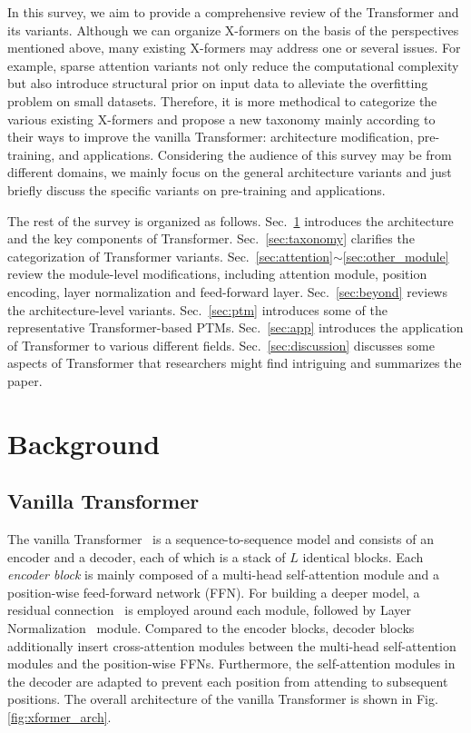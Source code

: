 \documentclass[manuscript,acmsmall,screen,nonacm]{acmart}
\theoremstyle{definition}
\begin{document}
In this survey, we aim to provide a comprehensive review of the Transformer and its variants. Although we can organize X-formers on the basis of the perspectives mentioned above, many existing X-formers may address one or several issues. For example, sparse attention variants not only reduce the computational complexity but also introduce structural prior on input data to alleviate the overfitting problem on small datasets. Therefore, it is more methodical to categorize the various existing X-formers and propose a new taxonomy mainly according to their ways to improve the vanilla Transformer: architecture modification, pre-training, and applications.
Considering the audience of this survey may be from different domains, we mainly focus on the general architecture variants and just briefly discuss the specific variants on pre-training and applications.

The rest of the survey is organized as follows. Sec.~\ref{sec:background} introduces the architecture and the key components of Transformer. Sec.~\ref{sec:taxonomy} clarifies the categorization of Transformer variants. Sec.~\ref{sec:attention}$\sim$\ref{sec:other_module} review the module-level modifications, including attention module, position encoding, layer normalization and feed-forward layer. Sec.~\ref{sec:beyond} reviews the architecture-level variants. Sec.~\ref{sec:ptm} introduces some of the representative Transformer-based PTMs. Sec.~\ref{sec:app} introduces the application of Transformer to various different fields. Sec.~\ref{sec:discussion} discusses some aspects of Transformer that researchers might find intriguing and summarizes the paper.


\section{Background}\label{sec:background}
\subsection{Vanilla Transformer}\label{sec:vanilla_xformer}
The vanilla Transformer~\cite{vaswani2017attention} is a sequence-to-sequence model and consists of an encoder and a decoder, each of which is a stack of $L$ identical blocks. Each \textit{encoder block} is mainly composed of a multi-head self-attention module and a position-wise feed-forward network (FFN).
For building a deeper model, a residual connection~\cite{he16resnet} is employed around each module, followed by Layer Normalization~\cite{ba16layernorm} module.
Compared to the encoder blocks, decoder blocks additionally insert cross-attention modules between the multi-head self-attention modules and the position-wise FFNs. Furthermore, the self-attention modules in the decoder are adapted to prevent each position from attending to subsequent positions.
The overall architecture of the vanilla Transformer is shown in Fig. \ref{fig:xformer_arch}.
\end{document}
